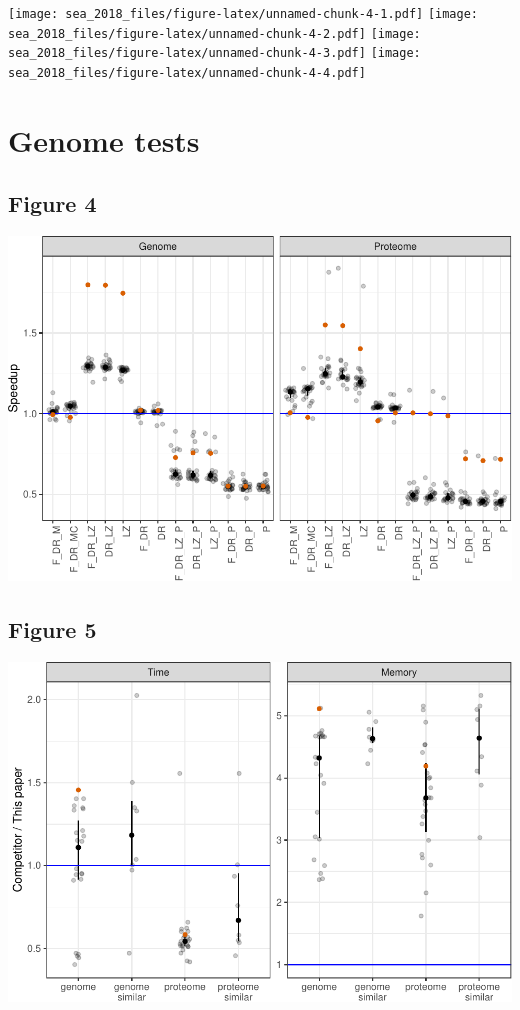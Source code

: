 \documentclass[]{article}
\begin{document}
\texttt{[image: sea\_2018\_files/figure-latex/unnamed-chunk-4-1.pdf]}
\texttt{[image: sea\_2018\_files/figure-latex/unnamed-chunk-4-2.pdf]}
\texttt{[image: sea\_2018\_files/figure-latex/unnamed-chunk-4-3.pdf]}
\texttt{[image: sea\_2018\_files/figure-latex/unnamed-chunk-4-4.pdf]}

\section{Genome tests}\label{genome-tests}

\subsection{Figure 4}\label{figure-4}

\includegraphics{sea_2018_files/figure-latex/fig4-1.pdf}

\subsection{Figure 5}\label{figure-5}

\includegraphics{sea_2018_files/figure-latex/fig5-1.pdf}
\end{document}
